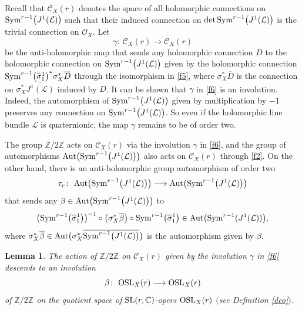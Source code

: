 \documentclass[10pt,a4paper]{amsart}
\numberwithin{equation}{section}
\newtheorem{Lemma}[Theorem]{Lemma}
\begin{document}
Recall that ${\mathcal C}_X(r)$ denotes the space of all holomorphic connections on ${\rm
Sym}^{r-1}\bigl(J^1(\mathcal L)\bigr)$ such that their induced connection on $\det {\rm Sym}^{r-1}\bigl(J^1(\mathcal
L)\bigr)$ is the trivial connection on ${\mathcal O}_X$. Let
\begin{equation}\label{f6}
\gamma\colon\ {\mathcal C}_X(r) \longrightarrow {\mathcal C}_X(r)
\end{equation}
be the anti-holomorphic map that sends any holomorphic connection $D$ to the
holomorphic connection on ${\rm
Sym}^{r-1}\bigl(J^1(\mathcal L)\bigr)$ given by the holomorphic connection ${\rm
Sym}^{r-1}\bigl(\widehat{\sigma}^1_1\bigr)^*\sigma^*_X\overline{D}$ through the
isomorphism in \eqref{f5}, where $\sigma^*_X\overline{D}$ is the connection on
$\sigma^*_X\overline{J^1(\mathcal L)}$ induced by $D$. It can be shown that $\gamma$ in \eqref{f6} is an
involution. Indeed, the automorphism of ${\rm Sym}^{r-1}\bigl(J^1(\mathcal L)\bigr)$ given by multiplication by $-1$ preserves any
connection on ${\rm Sym}^{r-1}\bigl(J^1(\mathcal L)\bigr)$. So even if the holomorphic line bundle
$\mathcal L$ is quaternionic, the map $\gamma$ remains to be of order two.

The group ${\mathbb Z}/2{\mathbb Z}$ acts on ${\mathcal C}_X(r)$ via the involution $\gamma$
in \eqref{f6}, and the group of automorphisms $\text{Aut}\bigl({\rm Sym}^{r-1}\bigl(J^1(\mathcal L)\bigr)\bigr)$ also acts on
${\mathcal C}_X(r)$ through \eqref{f2}. On the other hand, there is an anti-holomorphic group
automorphism of order two
\begin{gather}\label{f8}
\tau_r\colon\ \text{Aut}\bigl({\rm Sym}^{r-1}\bigl(J^1(\mathcal L)\bigr)\bigr) \longrightarrow
\text{Aut}\bigl({\rm Sym}^{r-1}\bigl(J^1(\mathcal L)\bigr)\bigr)
\end{gather}
that sends any $\beta \in \text{Aut}\bigl({\rm Sym}^{r-1}\bigl(J^1(\mathcal L)\bigr)\bigr)$ to
\[
\bigl({\rm Sym}^{r-1}\bigl(\widehat{\sigma}^1_1\bigr)\bigr)^{-1}\circ\bigl(\sigma^*_X\overline{\beta}\bigr)\circ
{\rm Sym}^{r-1}\bigl(\widehat{\sigma}^1_1\bigr) \in
\text{Aut}\bigl({\rm Sym}^{r-1}(J^1(\mathcal L))\bigr),
\]
where $\sigma^*_X\overline{\beta} \in \text{Aut}\bigl(\sigma^*_X\overline{{\rm Sym}^{r-1}
\bigl(J^1(\mathcal L)\bigr)}\bigr)$ is the automorphism given by $\beta$.

\begin{Lemma}\label{lem3}
The action of ${\mathbb Z}/2{\mathbb Z}$ on ${\mathcal C}_X(r)$ given by the involution $\gamma$
in \eqref{f6} descends to an involution
\begin{equation}\label{f7}
\beta\colon\ {\rm OSL}_X(r) \longrightarrow {\rm OSL}_X(r)
\end{equation}
of ${\mathbb Z}/2{\mathbb Z}$ on the quotient space of ${\rm SL}(r,\mathbb{C})$-opers
${\rm OSL}_X(r)$ $($see Definition {\rm \ref{deo}}$)$.
\end{Lemma}
\end{document}
